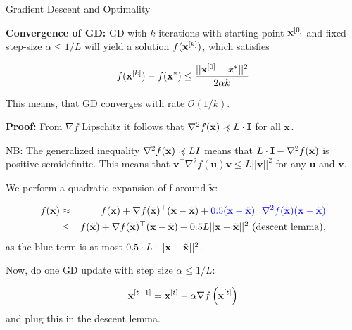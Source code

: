 \documentclass[11pt,compress,t,notes=noshow, xcolor=table]{beamer}
\begin{document}
\begin{vbframe}{Gradient Descent and Optimality}
	\lz 
		
	\textbf{Convergence of GD:} GD with $k$ iterations with starting point $\mathbf{x}^{[0]}$ and fixed step-size $\alpha \leq 1/L$ will yield a solution $f(\mathbf{x}^{[k]})$, which satisfies

	$$
		f(\mathbf{x}^{[k]}) - f(\mathbf{x}^\ast) \leq \frac{|| \mathbf{x}^{[0]} - {x}^\ast ||^2}{2\alpha k}
	$$
	
	This means, that GD converges with rate $\mathcal{O}(1/k)$.
	

	\framebreak 	
	
	\textbf{Proof: }
	From $\nabla f$ Lipschitz it follows that $\nabla^2 f(\mathbf{x}) \preccurlyeq L \cdot \mathbf{I}$ for all $\mathbf{x}$. 

	\vspace*{0.2cm}

	\begin{footnotesize} NB: The generalized inequality $\nabla^2 f(\mathbf{x}) \preccurlyeq L I$ means that $L \cdot \mathbf{I} - \nabla^2 f(\mathbf{x})$ is positive semidefinite. This means that $ \bm{v} ^\top \nabla^2 f(\bm{u}) \bm{v} \leq L || \bm{v} ||^2$ for any $\bm{u}$ and $ \bm{v} $. 
	\end{footnotesize}
	
	\vspace*{0.2cm}

	We perform a quadratic expansion of f around $\tilde{\mathbf{x}}$:

	\begin{eqnarray*}
		f(\mathbf{x}) &\approx& f(\tilde{\mathbf{x}}) + \nabla f(\tilde{\mathbf{x}})^\top (\mathbf{x} - \tilde{\mathbf{x}}) + \textcolor{blue}{0.5  (\mathbf{x} - \tilde{\mathbf{x}})^\top \nabla^2 f(\tilde{\mathbf{x}}) (\mathbf{x} - \tilde{\mathbf{x}})} \\
		& \leq & f(\tilde{\mathbf{x}}) + \nabla f(\tilde{\mathbf{x}})^\top (\mathbf{x} - \tilde{\mathbf{x}}) + 0.5 L ||\mathbf{x} - \tilde{\mathbf{x}}||^2 \text{ (descent lemma)},
	\end{eqnarray*}		
	as the blue term is at most $0.5 \cdot L \cdot ||\mathbf{x} - \tilde{\mathbf{x}}||^2$. 
	
	\lz 

	Now, do one GD update with step size $\alpha \leq 1/L$: 

	$$
	\mathbf{x}^{[t+1]} = \mathbf{x}^{[t]} - \alpha \nabla f\left(\mathbf{x}^{[t]}\right)
	$$ 
	and plug this in the descent lemma.
		

	\framebreak 	

	\begin{footnotesize}
	

\end{footnotesize}
\end{vbframe}
\end{document}
